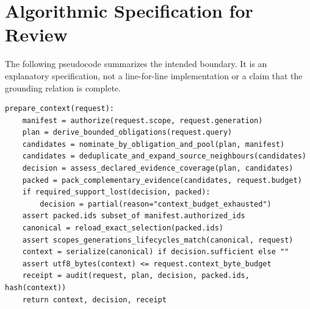 \documentclass[10pt,twocolumn]{article}
\begin{document}
\section{Algorithmic Specification for Review}
The following pseudocode summarizes the intended boundary. It is an explanatory specification, not a line-for-line implementation or a claim that the grounding relation is complete.
\begin{lstlisting}
prepare_context(request):
    manifest = authorize(request.scope, request.generation)
    plan = derive_bounded_obligations(request.query)
    candidates = nominate_by_obligation_and_pool(plan, manifest)
    candidates = deduplicate_and_expand_source_neighbours(candidates)
    decision = assess_declared_evidence_coverage(plan, candidates)
    packed = pack_complementary_evidence(candidates, request.budget)
    if required_support_lost(decision, packed):
        decision = partial(reason="context_budget_exhausted")
    assert packed.ids subset_of manifest.authorized_ids
    canonical = reload_exact_selection(packed.ids)
    assert scopes_generations_lifecycles_match(canonical, request)
    context = serialize(canonical) if decision.sufficient else ""
    assert utf8_bytes(context) <= request.context_byte_budget
    receipt = audit(request, plan, decision, packed.ids, hash(context))
    return context, decision, receipt
\end{lstlisting}
\end{document}
